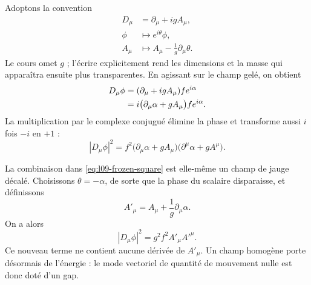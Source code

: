 Adoptons la convention \begin{equation}
\begin{aligned}
  D_\mu&=\partial_\mu+igA_\mu,
  \\
  \phi&\longmapsto e^{i\theta}\phi,
  \\
  A_\mu&\longmapsto A_\mu-\frac1g\partial_\mu\theta .
\end{aligned}
  \label{eq:l09-gauge-convention}
\end{equation}Le cours omet \(g\) ; l’écrire explicitement rend les dimensions et la masse qui apparaîtra ensuite plus transparentes. En agissant sur le champ gelé, on obtient \begin{align}
  D_\mu\phi
  &=(\partial_\mu+igA_\mu)f e^{i\alpha}
  \notag\\
  &=i\bigl(\partial_\mu\alpha+gA_\mu\bigr)
    f e^{i\alpha}.
  \label{eq:l09-covariant-frozen}
\end{align}La multiplication par le complexe conjugué élimine la phase et transforme aussi \(i\) fois \(-i\) en \(+1\) : \begin{equation}
  |D_\mu\phi|^2
  =f^2
   \bigl(\partial_\mu\alpha+gA_\mu\bigr)
   \bigl(\partial^\mu\alpha+gA^\mu\bigr).
  \label{eq:l09-frozen-square}
\end{equation}

\begin{classroomqa}\end{classroomqa}

La combinaison dans \eqref{eq:l09-frozen-square} est elle-même un champ de jauge décalé. Choisissons \(\theta=-\alpha\), de sorte que la phase du scalaire disparaisse, et définissons \begin{equation}
  A'_\mu=A_\mu+\frac1g\partial_\mu\alpha .
  \label{eq:l09-unitary-gauge-field}
\end{equation}On a alors \begin{equation}
  |D_\mu\phi|^2=g^2f^2 A'_\mu A'^\mu .
  \label{eq:l09-vector-mass-term}
\end{equation}Ce nouveau terme ne contient aucune dérivée de \(A'_\mu\). Un champ homogène porte désormais de l’énergie : le mode vectoriel de quantité de mouvement nulle est donc doté d’un gap.

